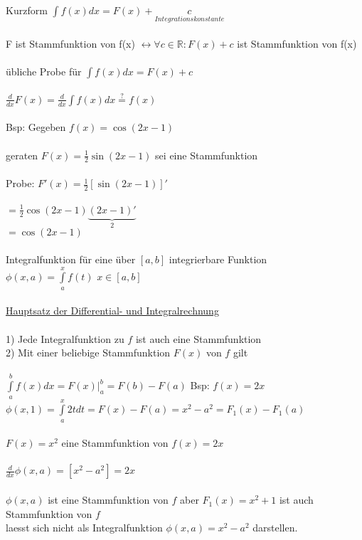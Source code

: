 \documentclass[14pt,a4paper]{article}
\begin{document}
Kurzform $ \int f(x) dx = F(x) + \underset {Integrationskonstante} {c} $\\\\ F ist Stammfunktion von f(x) $
\leftrightarrow  \forall c \in \mathbb{R}: F(x) + c $ ist Stammfunktion von f(x) \\\\ übliche Probe für $ \int f(x) dx = F(x) + c$ \\\\ {\large$
\frac{d}{dx} F(x) = \frac{d}{dx} \int f(x) dx \overset {?} {=} f(x) $} \\\\  Bsp: Gegeben $ f(x) = \cos (2 x -1) $ \\\\ geraten $ F(x) = \frac{1}{2} \sin (2x -1) $ sei eine Stammfunktion \\\\ Probe: $ F'(x) = \frac{1}{2} [\sin (2x -1)]' $ \\\\ $ = \frac{1}{2} \cos(2x -1) \underbrace{(2x -1)'}_{2} $ \\ $ = \cos (2x -1)$ \\\\
Integralfunktion für eine über $ [a,b] $ integrierbare Funktion \\ $ \phi (x,a) = \int\limits_{a}^{x} f(t) $ \quad $ x \in [a,b] $ \\\\ \underline{Hauptsatz der Differential- und Integralrechnung} \\\\
1) Jede Integralfunktion zu $f$ ist auch eine Stammfunktion \\
2) Mit einer beliebige Stammfunktion $F(x)$ von $f$ gilt \\\\ $ \int\limits_{a}^{b} f(x) dx = F(x) \Big| _a^b = F(b) - F(a)$
Bsp: $ f(x) = 2x $ \\ $ \phi (x,1) = \int\limits_{a}^{x} 2t dt = F(x) - F(a) = x^2 - a^2 = F_1(x) -F_1(a) $ \\\\ $ F(x) = x^2$ eine Stammfunktion von $ f(x) = 2x$ \\\\ {\large$ \frac{d}{dx}$}$ \phi (x,a) = [x^2-a^2] = 2x $ \\\\ $ 
\phi (x,a) $ ist eine Stammfunktion von $f$ 
aber $ F_1(x) = x^2 +1 $ ist auch Stammfunktion von $f$\\ laesst sich nicht als Integralfunktion $ \phi (x,a) = x^2 - a^2 $ darstellen. \\

\end{document}
